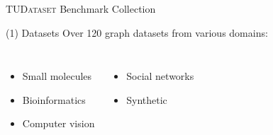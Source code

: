 \documentclass[utf8, xcolor=dvipsnames,ngerman]{beamer}
\begin{document}
\begin{frame}[t]{\textsc{TUDataset} Benchmark Collection}

\begin{block}{(1) Datasets}
Over 120 graph datasets from various domains:

\begin{columns}[T]
  \begin{itemize}
    \item \alert<2>{Small molecules}
    \item \alert<3>{Bioinformatics}
    \item \alert<4>{Computer vision}
  \end{itemize}
  \begin{itemize}
    \item \alert<5>{Social networks}
    \item \alert<6>{Synthetic}
   \end{itemize}
\end{columns}
\end{block}


\end{frame}
\end{document}
